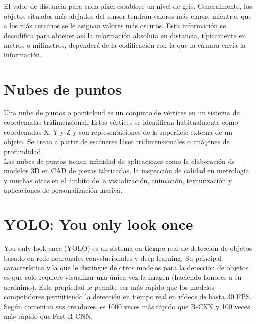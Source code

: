 
El valor de distancia para cada píxel establece un nivel de gris. Generalmente, los objetos situados más alejados del sensor tendrán valores más claros, mientras que a los más cercanos se le asignan valores más oscuros. Esta información se decodifica para obtener así la información absoluta en distancia, típicamente en metros o milímetros, dependerá de la codificación con la que la cámara envía la información.\\

\section{Nubes de puntos}

Una nube de puntos o pointcloud es un conjunto de vértices en un sistema de coordenadas tridimensional. Estos vértices se identifican habitualmente como coordenadas X, Y y Z y son representaciones de la superficie externa de un objeto. Se crean a partir de escáneres láser tridimensionales o imágenes de profundidad.\\

Las nubes de puntos tienen infinidad de aplicaciones como la elaboración de modelos 3D en CAD de piezas fabricadas, la inspección de calidad en metrología y muchas otras en el ámbito de la visualización, animación, texturización y aplicaciones de personalización masiva.\\


\section{YOLO: You only look once}

You only look once (YOLO) es un sistema en tiempo real de detección de objetos basado en rede neuronales convolucionales y deep learning. Su principal característica y la que le distingue de otros modelos para la detección de objetos es que solo requiere visualizar una única vez la imagen (haciendo honores a su acrónimo). Esta propiedad le permite ser más rápido que los modelos competidores permitiendo la detección en tiempo real en vídeos de hasta 30 FPS. Según comentan sus creadores, es 1000 veces más rápido que R-CNN y 100 veces más rápido que Fast R-CNN. \\


